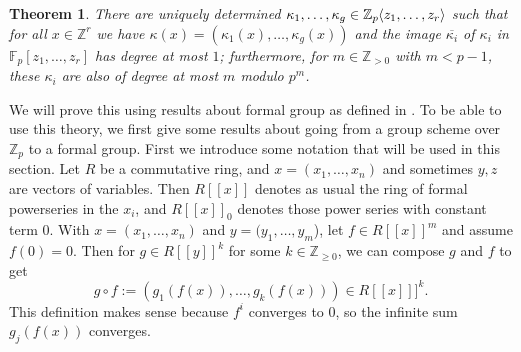 \documentclass[12pt]{article}
\newcommand{\Z}{\mathbb{Z}}
\newcommand{\F}{\mathbb{F}}
\renewcommand{\angle}[1]{\hspace{-2pt}\left\langle #1 \right\rangle}
\theoremstyle{plain}
\newtheorem{thm}{Theorem}[section] %
\theoremstyle{definition}
\theoremstyle{remark}
\begin{document}
\begin{thm}
\label{thm:kappanice}
There are uniquely determined $\kappa_1,\dots,\kappa_g \in \Z_p\angle{z_1,\dots,z_r}$ such that for all $x \in \Z^r$ we have $\kappa(x) = (\kappa_1(x),\dots,\kappa_g(x))$ and the image $\overline{\kappa_i}$ of $\kappa_i$ in $\F_p[z_1,\dots,z_r]$ has degree at most $1$; furthermore, for $m \in \Z_{>0}$ with $m<p-1$, these $\kappa_i$ are also of degree at most $m$ modulo $p^m$.
\end{thm}

We will prove this using results about formal group as defined in \cite{honda70}. To be able to use this theory, we first give some results about going from a group scheme over $\Z_p$ to a formal group.
First we introduce some notation that will be used in this section. Let $R$ be a commutative ring, and $x = (x_1,\dots,x_n)$ and sometimes $y,z$ are vectors of variables. Then $R[[x]]$ denotes as usual the ring of formal powerseries in the $x_i$, and $R[[x]]_0$ denotes those power series with constant term $0$. With $x = (x_1,\dots,x_n)$ and $y = (y_1,\dots,y_m$), let $f \in R[[x]]^m$ and assume $f(0) = 0$. Then for $g \in R[[y]]^k$ for some $k\in\Z_{\geq 0}$, we can compose $g$ and $f$ to get \[g\circ f := (g_1(f(x)),\dots,g_k(f(x)))\in R[[x]]]^k.\] This definition makes sense because $f^i$ converges to $0$, so the infinite sum $g_j(f(x))$ converges.
\end{document}
